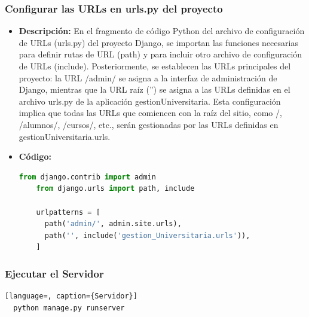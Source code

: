 \documentclass{article}
\begin{document}
  \subsubsection{Configurar las URLs en urls.py del proyecto}
  \begin{itemize}
    \item \textbf{Descripción: }En el fragmento de código Python del archivo de configuración de URLs (urls.py) 
    del proyecto Django, se importan las funciones necesarias para definir rutas de URL (path) y para incluir 
    otro archivo de configuración de URLs (include). Posteriormente, se establecen las URLs principales del proyecto: 
    la URL /admin/ se asigna a la interfaz de administración de Django, mientras que la URL raíz ('') se asigna a las URLs 
    definidas en el archivo urls.py de la aplicación gestionUniversitaria. Esta configuración implica que todas las URLs 
    que comiencen con la raíz del sitio, como /, /alumnos/, /cursos/, etc., serán gestionadas por las URLs definidas en 
    gestionUniversitaria.urls.
    \item \textbf{Código: }
    \begin{lstlisting}[language=python, caption={urls.py del proyecto}]
    from django.contrib import admin
    from django.urls import path, include

    urlpatterns = [
      path('admin/', admin.site.urls),
      path('', include('gestion_Universitaria.urls')),
    ]
    \end{lstlisting}
  \end{itemize}


  \subsubsection{Ejecutar el Servidor}
  \begin{lstlisting}[language=, caption={Servidor}]
  python manage.py runserver
  \end{lstlisting}
  
  
  \newpage
\end{document}

